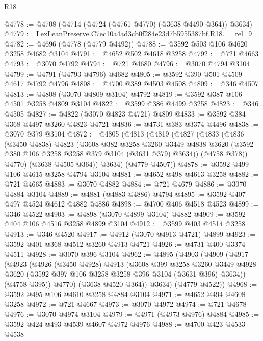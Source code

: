 \begin{lexlean}{R18}
\begin{coremodule}
@4778 := @4708 (@4714 (@4724 (@4761 @4770) (@3638 @4490 @364)) @3634)
@4779 := LexLeanPreserve.C7ec10a4ad3cb0f284e23d7b5955387bf.R18.__rel_9
@4782 := @4696 (@4778 (@4779 @4492))
@4788 := @3592 @503 @106 @4620 @3258 @4682 @3104
@4791 := @4652 @502 @4618 @3258
@4792 := @721 @4663
@4793 := @3070 @4792
@4794 := @721 @4680
@4796 := @3070 @4794 @3104
@4799 := @4791 (@4793 @4796) @4682
@4805 := @3592 @390 @501 @4509 @4617 @4792 @4796
@4808 := @4700 @389 @4503 @4508
@4809 := @346 @4507
@4813 := @4808 (@3070 @4809 @3104) @4792
@4819 := @3592 @387 @106 @4501 @3258 @4809 @3104
@4822 := @3599 @386 @4499 @3258
@4823 := @346 @4505
@4827 := @4822 (@3070 @4823 @4721) @4809
@4833 := @3592 @384 @368 @4497 @3260 @4823 @4721
@4836 := @4731 @383 @3374 @4496
@4838 := @3070 @379 @3104
@4872 := @4805
    (@4813
      (@4819
        (@4827
          (@4833
            (@4836
              (@3450 @4838)
              @4823
              (@3608
                @382
                @3258
                @3260
                @3449
                @4838
                @3620
                (@3592 @380 @106 @3258 @3258 @379 @3104 (@3631 @379) @3634))
              (@4758 @378))
            @4770)
          (@3638 @4505 @364))
        @3634)
      (@4779 @4507))
@4878 := @3592 @499 @106 @4615 @3258 @4794 @3104
@4881 := @4652 @498 @4613 @3258
@4882 := @721 @4665
@4883 := @3070 @4882
@4884 := @721 @4679
@4886 := @3070 @4884 @3104
@4889 := @4881 (@4883 @4886) @4794
@4895 := @3592 @407 @497 @4524 @4612 @4882 @4886
@4898 := @4700 @406 @4518 @4523
@4899 := @346 @4522
@4903 := @4898 (@3070 @4899 @3104) @4882
@4909 := @3592 @404 @106 @4516 @3258 @4899 @3104
@4912 := @3599 @403 @4514 @3258
@4913 := @346 @4520
@4917 := @4912 (@3070 @4913 @4721) @4899
@4923 := @3592 @401 @368 @4512 @3260 @4913 @4721
@4926 := @4731 @400 @3374 @4511
@4928 := @3070 @396 @3104
@4962 := @4895
    (@4903
      (@4909
        (@4917
          (@4923
            (@4926
              (@3450 @4928)
              @4913
              (@3608
                @399
                @3258
                @3260
                @3449
                @4928
                @3620
                (@3592 @397 @106 @3258 @3258 @396 @3104 (@3631 @396) @3634))
              (@4758 @395))
            @4770)
          (@3638 @4520 @364))
        @3634)
      (@4779 @4522))
@4968 := @3592 @495 @106 @4610 @3258 @4884 @3104
@4971 := @4652 @494 @4608 @3258
@4972 := @721 @4667
@4973 := @3070 @4972
@4974 := @721 @4678
@4976 := @3070 @4974 @3104
@4979 := @4971 (@4973 @4976) @4884
@4985 := @3592 @424 @493 @4539 @4607 @4972 @4976
@4988 := @4700 @423 @4533 @4538

\end{coremodule}
\end{lexlean}
